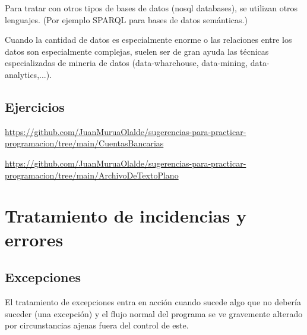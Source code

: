 \documentclass[spanish,12pt,a4paper,final,oneside]{book}
\begin{document}
Para tratar con otros tipos de bases de datos (nosql databases), se utilizan otros lenguajes. (Por ejemplo SPARQL para bases de datos semánticas.)

Cuando la cantidad de datos es especialmente enorme o las relaciones entre los datos son especialmente complejas, suelen ser de gran ayuda las técnicas especializadas de mineria de datos (data-wharehouse, data-mining, data-analytics,...).

\section{Ejercicios}

\url{https://github.com/JuanMuruaOlalde/sugerencias-para-practicar-programacion/tree/main/CuentasBancarias}

\url{https://github.com/JuanMuruaOlalde/sugerencias-para-practicar-programacion/tree/main/ArchivoDeTextoPlano}

\chapter{Tratamiento de incidencias y errores}

\section{Excepciones}
El tratamiento de excepciones entra en acción cuando sucede algo que no debería suceder (una excepción) y el flujo normal del programa se ve gravemente alterado por circunstancias ajenas fuera del control de este.
\end{document}
